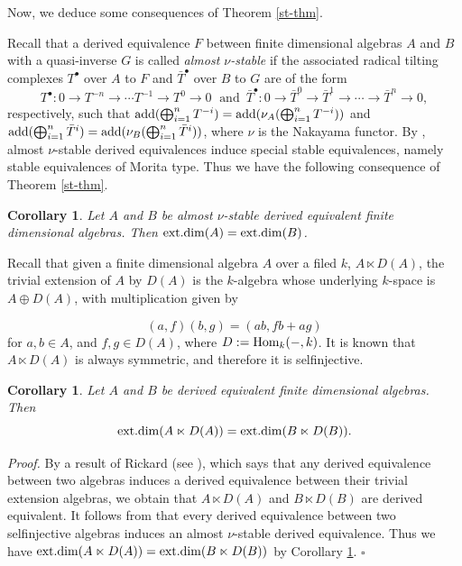 \documentclass[12pt]{article}
\numberwithin{equation}{section}
\newtheorem{Koro}[Def]{Corollary}
\theoremstyle{definition}
\newcommand{\add}{{\rm add}}
\def\ed{\mathop{\rm ext.dim}\nolimits}
\newcommand{\cpx}[1]{#1^{\bullet}}
\newcommand{\Hom}{{\rm Hom}}
\newcommand{\lra}{\longrightarrow}
\begin{document}
\medskip
Now, we deduce some consequences of Theorem \ref{st-thm}.

Recall that a derived equivalence $F$ between finite dimensional algebras $A$ and $B$ with a quasi-inverse $G$ is called \emph{almost $\nu$-stable} \cite{hx10} if the associated radical tilting complexes $\cpx{T}$ over $A$ to $F$ and $\cpx{\bar{T}}$ over $B$ to $G$ are of the form
$$ \cpx{T}: 0\lra T^{-n}\lra \cdots T^{-1}\lra T^0\lra 0 \; \mbox{ and } \,
\cpx{\bar{T}}: 0\lra \bar{T}^{0}\lra \bar{T}^1\lra \cdots \lra \bar{T}^{n}\lra 0,$$
respectively, such that $\add(\bigoplus_{i=1}^n T^{-i})=\add(\nu_A(\bigoplus_{i=1}^n T^{-i}))$ and $\add(\bigoplus_{i=1}^n \bar{T}^{i}) = \add(\nu_B(\bigoplus_{i=1}^n \bar{T}^{i}))$, where $\nu$ is the Nakayama functor. By \cite[Theorem 1.1(2)]{hx10}, almost $\nu$-stable derived equivalences induce special stable equivalences, namely stable equivalences of Morita type. Thus we have the following consequence of Theorem \ref{st-thm}.

\begin{Koro}\label{nu-s}
Let $A$ and $B$ be almost $\nu$-stable derived equivalent finite dimensional algebras. Then $\ed(A)=\ed(B)$.
\end{Koro}

Recall that given a finite dimensional algebra $A$ over a filed $k$, $A\ltimes D(A)$, the trivial extension of $A$ by $D(A)$ is the $k$-algebra whose underlying $k$-space is $A\oplus D(A)$, with multiplication given by

$$ (a,f)(b, g)= (ab,fb+ag)$$ for $a,b\in A$, and $f,g\in D(A)$, where $D:=\Hom_{k}(-,k)$. It is known that $A\ltimes D(A)$ is always symmetric, and therefore it is selfinjective.

\begin{Koro}
Let $A$ and $B$ be derived equivalent finite dimensional algebras. Then $$\ed(A\ltimes D(A))=\ed(B\ltimes D(B)).$$
\end{Koro}
{\it Proof.} By a result of Rickard (see \cite[Theorem 3.1]{r89}), which says that any derived equivalence between two algebras induces a derived equivalence between their trivial extension algebras, we obtain that $A\ltimes D(A)$ and $B\ltimes D(B)$ are derived equivalent.  It follows from \cite[Proposition 3.8]{hx10} that every derived equivalence between two selfinjective algebras induces an almost $\nu$-stable derived equivalence. Thus we have $\ed(A\ltimes D(A))=\ed(B\ltimes D(B))$ by Corollary \ref{nu-s}.
$\square$
\end{document}
